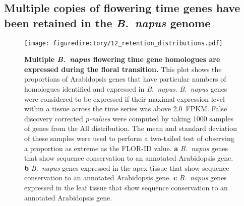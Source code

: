 \documentclass[12pt,]{book}
\begin{document}
\subsection{\texorpdfstring{Multiple copies of flowering time genes have
been retained in the \emph{B.~napus}
genome}{Multiple copies of flowering time genes have been retained in the B.~napus genome}}\label{section:spring:floweringretained}

\begin{figure}[htbp]
\centering
\texttt{[image: figuredirectory/12\_retention\_distributions.pdf]}
\caption{\textbf{Multiple \emph{B.~napus} flowering time gene homologues
are expressed during the floral transition.} This plot shows the
proportions of Arabidopsis genes that have particular numbers of
homologues identified and expressed in \emph{B.~napus}. \emph{B.~napus}
genes were considered to be expressed if their maximal expression level
within a tissue across the time series was above 2.0~FPKM. False
discovery corrected \emph{p-values} were computed by taking 1000 samples
of genes from the All distribution. The mean and standard deviation of
these samples were used to perform a two-tailed test of observing a
proportion as extreme as the FLOR-ID value. \textbf{a} \emph{B.~napus}
genes that show sequence conservation to an annotated Arabidopsis gene.
\textbf{b} \emph{B.~napus} genes expressed in the apex tissue that show
sequence conservation to an annotated Arabidopsis gene. \textbf{c}
\emph{B.~napus} genes expressed in the leaf tissue that show sequence
conservation to an annotated Arabidopsis
gene.}\label{figure:212:retentiondistribution}
\end{figure}
\end{document}
